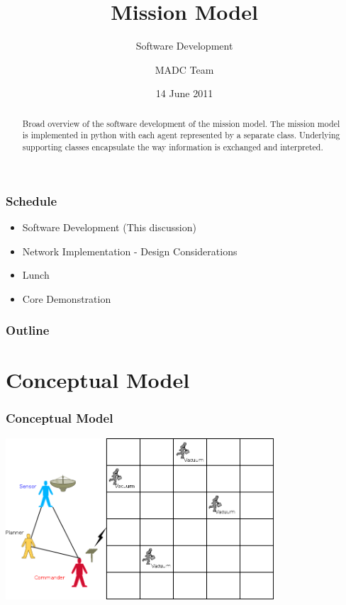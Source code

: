 \documentclass{beamer}
\begin{document}
\title{Mission Model}
\subtitle{Software Development}
\author{MADC Team}
\date{14 June 2011}

\begin{frame}
  \titlepage
  \begin{abstract}
    Broad overview of the software development of the mission
    model. The mission model is implemented in python with each agent
    represented by a separate class. Underlying supporting classes
    encapsulate the way information is exchanged and interpreted.
  \end{abstract}
\end{frame}



\begin{frame}
  \frametitle{Schedule}

  \begin{itemize}
  \item Software Development (This discussion) 
  \item Network Implementation - Design Considerations
  \item Lunch
  \item Core Demonstration
  \end{itemize}

\end{frame}


\begin{frame}
  \frametitle{Outline}
\end{frame}



\section{Conceptual Model}


\begin{frame}
  \frametitle{Conceptual Model}

  \includegraphics[height=6cm]{conceptualWorld.png}

\end{frame}
\end{document}
